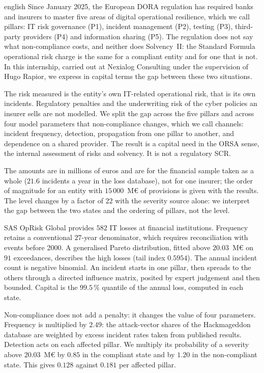\begin{otherlanguage*}{english}
Since January 2025, the European DORA regulation has required banks and insurers to master five
areas of digital operational resilience, which we call pillars: IT risk governance (P1), incident
management (P2), testing (P3), third-party providers (P4) and information sharing (P5). The
regulation does not say what non-compliance costs, and neither does Solvency~II: the Standard
Formula operational risk charge is the same for a compliant entity and for one that is not. In this
internship, carried out at Nexialog Consulting under the supervision of Hugo Rapior, we express in
capital terms the gap between these two situations.

The risk measured is the entity's own IT-related operational risk, that is its own incidents.
Regulatory penalties and the underwriting risk of the cyber policies an insurer sells are not
modelled. We split the gap across the five pillars and across four model parameters that
non-compliance changes, which we call channels: incident frequency, detection, propagation from one
pillar to another, and dependence on a shared provider. The result is a capital need in the ORSA
sense, the internal assessment of risks and solvency. It is not a regulatory SCR.

The amounts are in millions of euros and are for the financial sample taken as a whole
($21.6$ incidents a year in the loss database), not for one insurer; the order of magnitude for an
entity with $15\,000$~M\euro{} of provisions is given with the results. The level changes by a factor of $22$ with the severity source alone: we interpret the gap
between the two states and the ordering of pillars, not the level.

SAS OpRisk Global provides $582$ IT losses at financial institutions. Frequency retains a conventional $27$-year denominator, which requires reconciliation with events before 2000. A generalised Pareto distribution, fitted above $20.03$~M\euro{} on $91$ exceedances, describes
the high losses (tail index $0.5954$). The annual
incident count is negative binomial. An incident starts in one pillar, then spreads to the others
through a directed influence matrix, posited by expert judgement and then bounded.  Capital is the $99.5\,\%$ quantile
of the annual loss, computed in each state.

Non-compliance does not add a penalty: it changes the value of four parameters. Frequency is multiplied by $2.49$: the attack-vector shares of the Hackmageddon database are
weighted by excess incident rates taken from published results. Detection acts on each affected pillar.
We multiply its probability of a severity above $20.03$~M\euro{} by $0.85$ in the compliant state and by $1.20$ in the non-compliant state.
This gives $0.128$ against $0.181$ per affected pillar.


\end{otherlanguage*}
